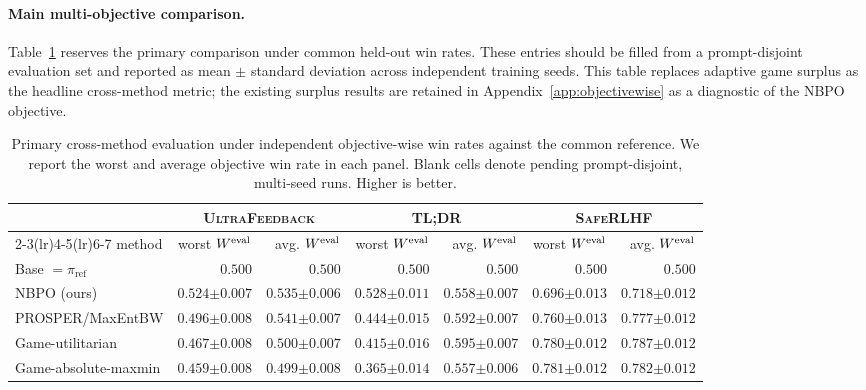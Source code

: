 \documentclass{article}
\theoremstyle{remark}
\theoremstyle{plain}
\newcommand{\piref}{\pi_{\mathrm{ref}}}
\newcommand{\NBPO}{\textsc{NBPO}}
\begin{document}
\paragraph{Main multi-objective comparison.}
Table~\ref{tab:multi-dataset-external} reserves the primary comparison under common held-out win rates. These entries should be filled from a prompt-disjoint evaluation set and reported as mean $\pm$ standard deviation across independent training seeds. This table replaces adaptive game surplus as the headline cross-method metric; the existing surplus results are retained in Appendix~\ref{app:objectivewise} as a diagnostic of the NBPO objective.

\begin{table}[t]
\centering\scriptsize
\setlength{\tabcolsep}{2.5pt}
\caption{Primary cross-method evaluation under independent objective-wise win rates against the common reference. We report the worst and average objective win rate in each panel. Blank cells denote pending prompt-disjoint, multi-seed runs. Higher is better.}
\label{tab:multi-dataset-external}
\begin{tabular}{lrrrrrr}
\toprule
& \multicolumn{2}{c}{\textsc{UltraFeedback}} & \multicolumn{2}{c}{\textsc{TL;DR}} & \multicolumn{2}{c}{\textsc{SafeRLHF}}\\
\cmidrule(lr){2-3}\cmidrule(lr){4-5}\cmidrule(lr){6-7}
method & worst $W^{\rm eval}$ & avg. $W^{\rm eval}$ & worst $W^{\rm eval}$ & avg. $W^{\rm eval}$ & worst $W^{\rm eval}$ & avg. $W^{\rm eval}$\\
\midrule
Base $=\piref$ & $0.500$ & $0.500$ & $0.500$ & $0.500$ & $0.500$ & $0.500$\\
\NBPO{} (ours) & $0.524{\scriptstyle\pm0.007}$ & $0.535{\scriptstyle\pm0.006}$ & $0.528{\scriptstyle\pm0.011}$ & $0.558{\scriptstyle\pm0.007}$ & $0.696{\scriptstyle\pm0.013}$ & $0.718{\scriptstyle\pm0.012}$\\
PROSPER/MaxEntBW & $0.496{\scriptstyle\pm0.008}$ & $0.541{\scriptstyle\pm0.007}$ & $0.444{\scriptstyle\pm0.015}$ & $0.592{\scriptstyle\pm0.007}$ & $0.760{\scriptstyle\pm0.013}$ & $0.777{\scriptstyle\pm0.012}$\\
Game-utilitarian & $0.467{\scriptstyle\pm0.008}$ & $0.500{\scriptstyle\pm0.007}$ & $0.415{\scriptstyle\pm0.016}$ & $0.595{\scriptstyle\pm0.007}$ & $0.780{\scriptstyle\pm0.012}$ & $\mathbf{0.787{\scriptstyle\pm0.012}}$\\
Game-absolute-maxmin & $0.459{\scriptstyle\pm0.008}$ & $0.499{\scriptstyle\pm0.008}$ & $0.365{\scriptstyle\pm0.014}$ & $0.557{\scriptstyle\pm0.006}$ & $\mathbf{0.781{\scriptstyle\pm0.012}}$ & $0.782{\scriptstyle\pm0.012}$\\

\end{tabular}
\end{table}
\end{document}
